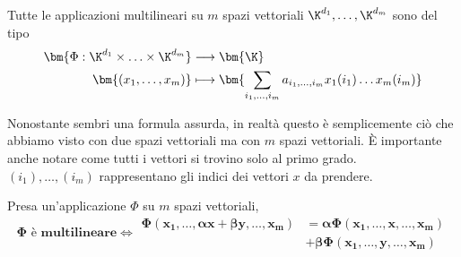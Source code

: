 \documentclass[11pt, a4paper, titlepage, oneside]{scrbook}
\begin{document}
\begin{Proposizione}[Corollario]
\label{corol-app-multilin}
Tutte le applicazioni multilineari su $m$ spazi vettoriali $\K^{d_1}, \ldots, \K^{d_m}$ sono del tipo
\begin{align*}
\bm{\Phi: \K^{d_1} \times \ldots \times \K^{d_m}} &\longrightarrow \bm{\K} \\
\bm{(x_1, \ldots, x_m)} &\longmapsto \bm{\sum_{i_1, \ldots, i_m} a_{i_1, \ldots, i_m} x_1(i_1) \ldots x_m(i_m)}
\end{align*}

Nonostante sembri una formula assurda, in realtà questo è semplicemente ciò che abbiamo visto con due spazi vettoriali ma con $m$ spazi vettoriali. È importante anche notare come tutti i vettori si trovino solo al primo grado.\\
\NB $(i_1), \ldots, (i_m)$ rappresentano gli indici dei vettori $x$ da prendere.
\end{Proposizione}

\begin{Proposizione}[]
\label{propos-multilineareità-di-un-applicazione}
Presa un'applicazione $\Phi$ su $m$ spazi vettoriali, \\
\[
\bm{\Phi} \textbf{ è multilineare} \iff
\begin{aligned}
\bm{\Phi(x_1, \ldots, \alpha x + \beta y, \ldots, x_m)} &= \bm{\alpha \Phi(x_1, \ldots, x, \ldots, x_m)} \\
&+ \bm{\beta \Phi(x_1, \ldots, y, \ldots, x_m)}
\end{aligned}
\]
\end{Proposizione}

\vspace{2cm}

\Dimostrazione \nopagebreak
\end{document}
